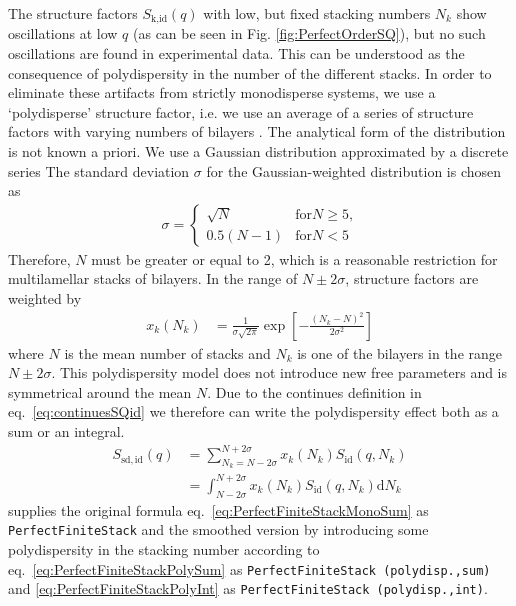 The structure factors $S_\text{k,id}(q)$ with low, but fixed
stacking numbers $N_k$ show oscillations at low $q$ (as can be seen in
Fig. \ref{fig:PerfectOrderSQ}), but no such oscillations are found in
experimental data. This can be understood as the consequence of
polydispersity in the number of the different stacks. In order to
eliminate these artifacts from strictly monodisperse systems, we use
a `polydisperse' structure factor, i.e. we use an average of a
series of structure factors with varying numbers of bilayers
\cite{Fruhwirth2004}. The analytical form of the distribution is not
known a priori. We use a Gaussian distribution approximated by a
discrete series The standard deviation $\sigma$ for the
Gaussian-weighted distribution is chosen as
\begin{align}
\sigma =
\begin{cases}
\sqrt{N} & \text{for} N\geq 5 \text{,} \\
0.5(N-1) & \text{for} N< 5
\end{cases}
\end{align}
Therefore, $N$ must be greater or equal to 2, which is a
reasonable restriction for multilamellar stacks of bilayers. In
the range of $N \pm 2\sigma$, structure factors are weighted by
\begin{align}
x_k(N_k) & = \frac{1}{\sigma\sqrt{2\pi}} \exp\left[
-\frac{(N_k-N)^2}{2\sigma^2}\right]
\end{align}
where $N$ is the mean number of stacks and $N_k$
is one of the  bilayers in the range $N\pm 2\sigma$. This
polydispersity model does not introduce new free parameters and is
symmetrical around the mean $N$. Due to the continues definition in eq.\ \ref{eq:continuesSQid} we therefore can write the polydispersity effect both as a sum or an integral.
\begin{align}
  S_\mathrm{sd,id}(q) & = \sum_{N_k=N-2\sigma}^{N+2\sigma} x_k(N_k) S_\mathrm{id}(q,N_k) \label{eq:PerfectFiniteStackPolySum} \\
   & = \int_{N-2\sigma}^{N+2\sigma} x_k(N_k) S_\mathrm{id}(q,N_k) \mathrm{d}N_k
  \label{eq:PerfectFiniteStackPolyInt}
\end{align}
\SASfit supplies the original formula eq.\ \ref{eq:PerfectFiniteStackMonoSum} as  \texttt{PerfectFiniteStack} and the smoothed version by introducing some polydispersity in the stacking number according to eq.\ \ref{eq:PerfectFiniteStackPolySum} as \texttt{PerfectFiniteStack (polydisp.,sum)} and \ref{eq:PerfectFiniteStackPolyInt} as \texttt{PerfectFiniteStack (polydisp.,int)}.

